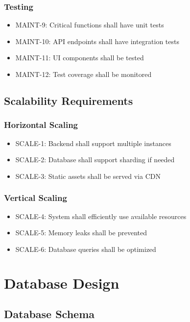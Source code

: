 \documentclass{scrreprt}
\begin{document}
\subsection{Testing}
\begin{itemize}
\item MAINT-9: Critical functions shall have unit tests
\item MAINT-10: API endpoints shall have integration tests
\item MAINT-11: UI components shall be tested
\item MAINT-12: Test coverage shall be monitored
\end{itemize}

\section{Scalability Requirements}

\subsection{Horizontal Scaling}
\begin{itemize}
\item SCALE-1: Backend shall support multiple instances
\item SCALE-2: Database shall support sharding if needed
\item SCALE-3: Static assets shall be served via CDN
\end{itemize}

\subsection{Vertical Scaling}
\begin{itemize}
\item SCALE-4: System shall efficiently use available resources
\item SCALE-5: Memory leaks shall be prevented
\item SCALE-6: Database queries shall be optimized
\end{itemize}


\chapter{Database Design}

\section{Database Schema}
\end{document}
